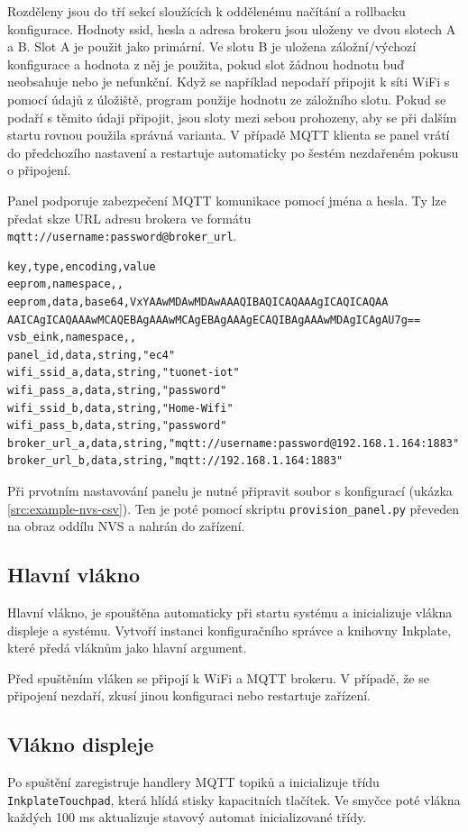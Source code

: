 Rozděleny jsou do tří sekcí sloužících k oddělenému načítání a rollbacku konfigurace. Hodnoty ssid, hesla a adresa brokeru jsou uloženy ve dvou slotech A a B. Slot A je použit jako primární. Ve slotu B je uložena záložní/výchozí konfigurace a hodnota z něj je použita, pokud slot žádnou hodnotu buď neobsahuje nebo je nefunkční. Když se například nepodaří připojit k síti WiFi s pomocí údajů z úložiště, program použije hodnotu ze záložního slotu. Pokud se podaří s těmito údaji připojit, jsou sloty mezi sebou prohozeny, aby se při dalším startu rovnou použila správná varianta. V případě MQTT klienta se panel vrátí do předchozího nastavení a restartuje automaticky po šestém nezdařeném pokusu o připojení.

Panel podporuje zabezpečení MQTT komunikace pomocí jména a hesla. Ty lze předat skze URL adresu brokera ve formátu \verb|mqtt://username:password@broker_url|.

\begin{lstlisting}[label=src:example-nvs-csv,caption={Ukázkový provizní soubor, řádek "eepro,data" rozdělen pro účel prezentace}]
key,type,encoding,value
eeprom,namespace,,
eeprom,data,base64,VxYAAwMDAwMDAwAAAQIBAQICAQAAAgICAQICAQAA AAICAgICAQAAAwMCAQEBAgAAAwMCAgEBAgAAAgECAQIBAgAAAwMDAgICAgAU7g==
vsb_eink,namespace,,
panel_id,data,string,"ec4"
wifi_ssid_a,data,string,"tuonet-iot"
wifi_pass_a,data,string,"password"
wifi_ssid_b,data,string,"Home-Wifi"
wifi_pass_b,data,string,"password"
broker_url_a,data,string,"mqtt://username:password@192.168.1.164:1883"
broker_url_b,data,string,"mqtt://192.168.1.164:1883"
\end{lstlisting}

Při prvotním nastavování panelu je nutné připravit soubor s konfigurací (ukázka \ref{src:example-nvs-csv}). Ten je poté pomocí skriptu \lstinline{provision_panel.py} převeden na obraz oddílu NVS a nahrán do zařízení.

\subsection{Hlavní vlákno}
Hlavní vlákno, je spouštěna automaticky při startu systému a inicializuje vlákna displeje a systému. Vytvoří instanci konfiguračního správce a knihovny Inkplate, které předá vláknům jako hlavní argument.

Před spuštěním vláken se připojí k WiFi a MQTT brokeru. V případě, že se připojení nezdaří, zkusí jinou konfiguraci nebo restartuje zařízení.

\subsection{Vlákno displeje}
Po spuštění zaregistruje handlery MQTT topiků a inicializuje třídu \lstinline|InkplateTouchpad|, která hlídá stisky kapacitních tlačítek. Ve smyčce poté vlákna každých 100 ms aktualizuje stavový automat inicializované třídy.

